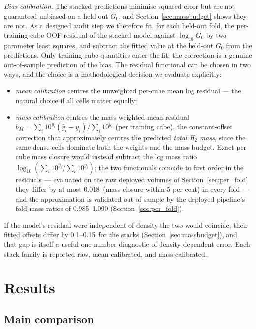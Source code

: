 \documentclass[fleqn,usenatbib]{rasti}
\newcommand{\Gzero}{G_0}
\newcommand{\dex}{\,\text{dex}}
\begin{document}
\emph{Bias calibration.} The stacked predictions minimise squared error
but are not guaranteed unbiased on a held-out \(\Gzero\), and
Section~\ref{sec:massbudget} shows they are not. As a designed audit
step we therefore fit, for each held-out fold, the per-training-cube OOF
residual of the stacked model against \(\log_{10}\Gzero\) by two-parameter
least squares, and subtract the fitted value at the held-out \(\Gzero\)
from the predictions. Only training-cube quantities enter the fit; the
correction is a genuine out-of-sample prediction of the bias. The
residual functional can be chosen in two ways, and the choice is a
methodological decision we evaluate explicitly:
\begin{itemize}
\item \emph{mean calibration} centres the unweighted per-cube mean log
  residual --- the natural choice if all cells matter equally;
\item \emph{mass calibration} centres the mass-weighted mean residual
  \(b_M = \sum_i 10^{y_i}(\hat{y}_i - y_i) / \sum_i 10^{y_i}\)
  (per training cube), the constant-offset correction that
  approximately centres the predicted \emph{total H\(_2\) mass}, since
  the same dense cells dominate both the weights and the mass budget.
  Exact per-cube mass closure would instead subtract the log mass
  ratio \(\log_{10}(\sum_i 10^{\hat{y}_i} / \sum_i 10^{y_i})\); the two
  functionals coincide to first order in the residuals --- evaluated on
  the raw deployed volumes of Section~\ref{sec:per_fold} they differ by
  at most 0.018\dex{} (mass closure within 5 per cent) in every fold ---
  and the approximation is validated out of sample by the deployed
  pipeline's fold mass ratios of 0.985--1.090
  (Section~\ref{sec:per_fold}).
\end{itemize}
If the model's residual were independent of density the two would
coincide; their fitted offsets differ by 0.1--0.15\dex{} for the stacks
(Section~\ref{sec:massbudget}), and that gap is itself a useful
one-number diagnostic of density-dependent error. Each stack family is
reported raw, mean-calibrated, and mass-calibrated.

\section{Results}
\label{sec:results}

\subsection{Main comparison}
\label{sec:results_main}
\end{document}
